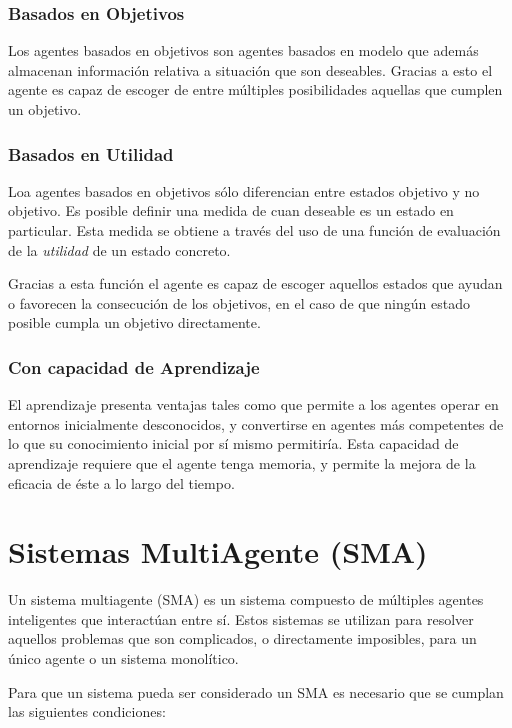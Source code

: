 \subsubsection*{Basados en Objetivos}

Los agentes basados en objetivos son agentes basados en modelo que además
almacenan información relativa a situación que son deseables. Gracias a esto el
agente es capaz de escoger de entre múltiples posibilidades aquellas que
cumplen un objetivo.

\subsubsection*{Basados en Utilidad}

Loa agentes basados en objetivos sólo diferencian entre estados objetivo y no
objetivo. Es posible definir una medida de cuan deseable es un estado en
particular. Esta medida se obtiene a través del uso de una función de
evaluación de la {\em utilidad} de un estado concreto.

Gracias a esta función el agente es capaz de escoger aquellos estados que
ayudan o favorecen la consecución de los objetivos, en el caso de que ningún
estado posible cumpla un objetivo directamente.

\subsubsection*{Con capacidad de Aprendizaje}

El aprendizaje presenta ventajas tales como que permite a los agentes operar en
entornos inicialmente desconocidos, y convertirse en agentes más competentes
de lo que su conocimiento inicial por sí mismo permitiría. Esta capacidad de
aprendizaje requiere que el agente tenga memoria, y permite la mejora de la
eficacia de éste a lo largo del tiempo.

\section*{Sistemas MultiAgente (SMA)}


Un sistema multiagente (SMA) es un sistema compuesto de múltiples agentes
inteligentes que interactúan entre sí. Estos sistemas se utilizan para resolver
aquellos problemas que son complicados, o directamente imposibles, para un único
agente o un sistema monolítico.

Para que un sistema pueda ser considerado un SMA es necesario que se cumplan
las siguientes condiciones:

